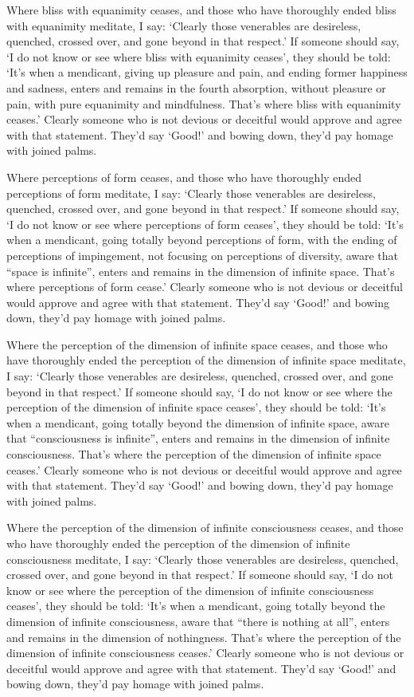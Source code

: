 \documentclass[12pt,openany]{book}%
\begin{document}
Where bliss with equanimity ceases, and those who have thoroughly ended bliss with equanimity meditate, I say: ‘Clearly those venerables are desireless, quenched, crossed over, and gone beyond in that respect.’ If someone should say, ‘I do not know or see where bliss with equanimity ceases’, they should be told: ‘It’s when a mendicant, giving up pleasure and pain, and ending former happiness and sadness, enters and remains in the fourth absorption, without pleasure or pain, with pure equanimity and mindfulness. That’s where bliss with equanimity ceases.’ Clearly someone who is not devious or deceitful would approve and agree with that statement. They’d say ‘Good!’ and bowing down, they’d pay homage with joined palms. 

Where perceptions of form ceases, and those who have thoroughly ended perceptions of form meditate, I say: ‘Clearly those venerables are desireless, quenched, crossed over, and gone beyond in that respect.’ If someone should say, ‘I do not know or see where perceptions of form ceases’, they should be told: ‘It’s when a mendicant, going totally beyond perceptions of form, with the ending of perceptions of impingement, not focusing on perceptions of diversity, aware that “space is infinite”, enters and remains in the dimension of infinite space. That’s where perceptions of form cease.’ Clearly someone who is not devious or deceitful would approve and agree with that statement. They’d say ‘Good!’ and bowing down, they’d pay homage with joined palms. 

Where the perception of the dimension of infinite space ceases, and those who have thoroughly ended the perception of the dimension of infinite space meditate, I say: ‘Clearly those venerables are desireless, quenched, crossed over, and gone beyond in that respect.’ If someone should say, ‘I do not know or see where the perception of the dimension of infinite space ceases’, they should be told: ‘It’s when a mendicant, going totally beyond the dimension of infinite space, aware that “consciousness is infinite”, enters and remains in the dimension of infinite consciousness. That’s where the perception of the dimension of infinite space ceases.’ Clearly someone who is not devious or deceitful would approve and agree with that statement. They’d say ‘Good!’ and bowing down, they’d pay homage with joined palms. 

Where the perception of the dimension of infinite consciousness ceases, and those who have thoroughly ended the perception of the dimension of infinite consciousness meditate, I say: ‘Clearly those venerables are desireless, quenched, crossed over, and gone beyond in that respect.’ If someone should say, ‘I do not know or see where the perception of the dimension of infinite consciousness ceases’, they should be told: ‘It’s when a mendicant, going totally beyond the dimension of infinite consciousness, aware that “there is nothing at all”, enters and remains in the dimension of nothingness. That’s where the perception of the dimension of infinite consciousness ceases.’ Clearly someone who is not devious or deceitful would approve and agree with that statement. They’d say ‘Good!’ and bowing down, they’d pay homage with joined palms. 
\end{document}
